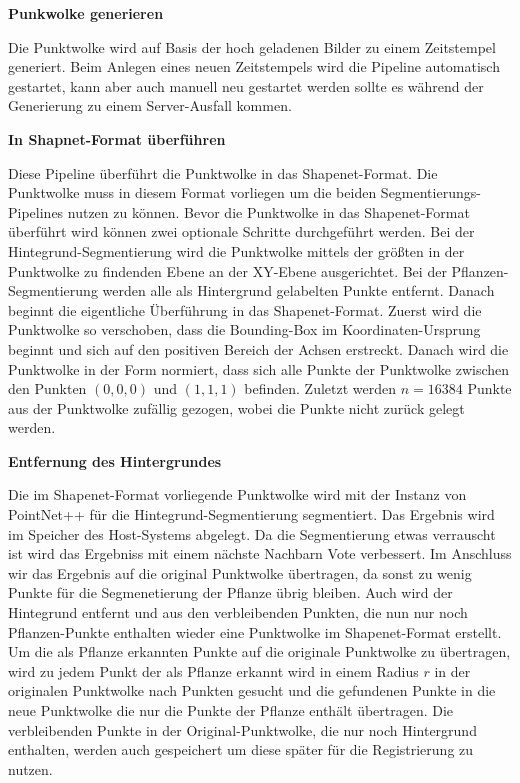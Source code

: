 \documentclass[12pt,titlepage, twoside]{article}
\begin{document}
\textbf{Punkwolke generieren}

Die Punktwolke wird auf Basis der hoch geladenen Bilder zu einem Zeitstempel generiert. Beim Anlegen eines neuen Zeitstempels wird die Pipeline automatisch gestartet, kann aber auch manuell neu gestartet werden sollte es während der Generierung zu einem Server-Ausfall kommen.

\textbf{In Shapnet-Format überführen}


Diese Pipeline überführt die Punktwolke in das Shapenet-Format. Die Punktwolke muss in diesem Format vorliegen um die beiden Segmentierungs-Pipelines nutzen zu können.
Bevor die Punktwolke in das Shapenet-Format überführt wird können zwei optionale Schritte durchgeführt werden.
Bei der Hintegrund-Segmentierung wird die Punktwolke mittels der größten in der Punktwolke zu findenden Ebene an der XY-Ebene ausgerichtet.
Bei der Pflanzen-Segmentierung werden alle als Hintergrund gelabelten Punkte entfernt. Danach beginnt die eigentliche Überführung in das Shapenet-Format.
Zuerst wird die Punktwolke so verschoben, dass die Bounding-Box im Koordinaten-Ursprung beginnt und sich auf den positiven Bereich der Achsen erstreckt.
Danach wird die Punktwolke in der Form normiert, dass sich alle Punkte der Punktwolke zwischen den Punkten $(0,0,0)$ und $(1,1,1)$ befinden.
Zuletzt werden $n=16384$ Punkte aus der Punktwolke zufällig gezogen, wobei die Punkte nicht zurück gelegt werden.

\textbf{Entfernung des Hintergrundes}

Die im Shapenet-Format vorliegende Punktwolke wird mit der Instanz von PointNet++ für die Hintegrund-Segmentierung segmentiert. Das Ergebnis wird im Speicher des Host-Systems abgelegt.
Da die Segmentierung etwas verrauscht ist wird das Ergebniss mit einem nächste Nachbarn Vote verbessert.
Im Anschluss wir das Ergebnis auf die original Punktwolke übertragen, da sonst zu wenig Punkte für die Segmenetierung der Pflanze übrig bleiben.
Auch wird der Hintegrund entfernt und aus den verbleibenden Punkten, die nun nur noch Pflanzen-Punkte enthalten wieder eine Punktwolke im Shapenet-Format erstellt.
Um die als Pflanze erkannten Punkte auf die originale Punktwolke zu übertragen, wird zu jedem Punkt der als Pflanze erkannt wird in einem Radius $r$ in der originalen Punktwolke nach Punkten gesucht 
und die gefundenen Punkte in die neue Punktwolke die nur die Punkte der Pflanze enthält übertragen. Die verbleibenden Punkte in der Original-Punktwolke, die nur noch Hintergrund enthalten, werden auch gespeichert um diese später für die Registrierung zu nutzen.
\end{document}
